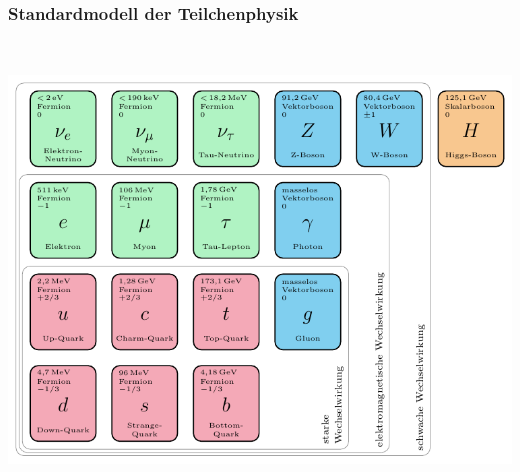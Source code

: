 \documentclass[10pt,t]{beamer}
\begin{document}
\begin{frame}\centering
\frametitle{Standardmodell der Teilchenphysik}
\vspace*{-2.5\baselineskip}
\begin{columns}
~\\[-\baselineskip]
    \includegraphics[width=\textwidth]{standardmodell-de}
~\\[4cm]
     \\[0.5cm]
\end{columns}

\vspace*{-5pt}
\end{frame}
\end{document}
